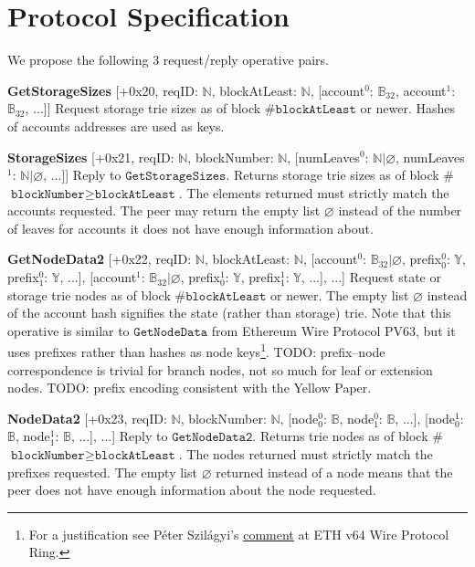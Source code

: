 \documentclass{amsart}
\begin{document}
\section{Protocol Specification}

We propose the following 3 request/reply operative pairs.

\textbf{GetStorageSizes} [+0x20, reqID: $\mathbb{N}$, blockAtLeast: $\mathbb{N}$,
[account$^0$: $\mathbb{B}_{32}$, account$^1$: $\mathbb{B}_{32}$, ...]]
Request storage trie sizes as of block \#$\texttt{blockAtLeast}$ or newer.
Hashes of accounts addresses are used as keys.

\textbf{StorageSizes} [+0x21, reqID: $\mathbb{N}$, blockNumber: $\mathbb{N}$,
[numLeaves$^0$: $\mathbb{N} | \varnothing$, numLeaves$^1$: $\mathbb{N} | \varnothing$, ...]]
Reply to $\texttt{GetStorageSizes}$.
Returns storage trie sizes as of block \#$\texttt{blockNumber} \geq \texttt{blockAtLeast}$.
The elements returned must strictly match the accounts requested.
The peer may return the empty list $\varnothing$ instead of the number of leaves for accounts it does not have enough information about.

\textbf{GetNodeData2} [+0x22, reqID: $\mathbb{N}$, blockAtLeast: $\mathbb{N}$,
[account$^0$: $\mathbb{B}_{32} | \varnothing$, prefix$^0_0$: $\mathbb{Y}$, prefix$^0_1$: $\mathbb{Y}$, ...],
[account$^1$: $\mathbb{B}_{32} | \varnothing$, prefix$^1_0$: $\mathbb{Y}$, prefix$^1_1$: $\mathbb{Y}$, ...],
...]
Request state or storage trie nodes as of block \#$\texttt{blockAtLeast}$ or newer.
The empty list $\varnothing$ instead of the account hash signifies the state (rather than storage) trie.
Note that this operative is similar to $\texttt{GetNodeData}$ from Ethereum Wire Protocol PV63,
but it uses prefixes rather than hashes as node keys\footnote{For
a justification see Péter Szilágyi's
\href{https://ethereum-magicians.org/t/forming-a-ring-eth-v64-wire-protocol-ring/2857/10}{comment}
at ETH v64 Wire Protocol Ring.}.
TODO: prefix--node correspondence is trivial for branch nodes, not so much for leaf or extension nodes.
TODO: prefix encoding consistent with the Yellow Paper.

\textbf{NodeData2} [+0x23, reqID: $\mathbb{N}$,  blockNumber: $\mathbb{N}$,
[node$^0_0$: $\mathbb{B}$, node$^0_1$: $\mathbb{B}$, ...],
[node$^1_0$: $\mathbb{B}$, node$^1_1$: $\mathbb{B}$, ...],
...]
Reply to $\texttt{GetNodeData2}$.
Returns trie nodes as of block \#$\texttt{blockNumber} \geq \texttt{blockAtLeast}$.
The nodes returned must strictly match the prefixes requested.
The empty list $\varnothing$ returned instead of a node means that the peer does not have enough information about the node requested.
\end{document}

